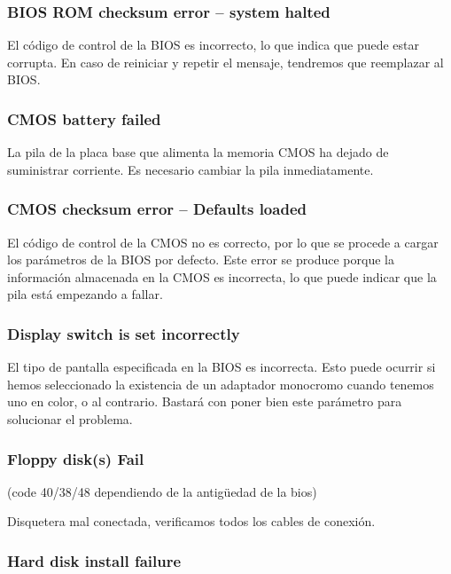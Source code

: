 \documentclass[12pt,oneside,a4paper]{article}
\begin{document}
		\subsubsection{BIOS ROM checksum error – system halted}

		El código de control de la BIOS es incorrecto, lo que indica que puede
		estar corrupta. En caso de reiniciar y repetir el mensaje, tendremos
		que reemplazar al BIOS.

		\subsubsection{CMOS battery failed}

		La pila de la placa base que alimenta la memoria CMOS ha dejado de
		suministrar corriente. Es necesario cambiar la pila inmediatamente.

		\subsubsection{CMOS checksum error – Defaults loaded}

		El código de control de la CMOS no es correcto, por lo que se
		procede a cargar los parámetros de la BIOS por defecto. Este error
		se produce porque la información almacenada en la CMOS es
		incorrecta, lo que puede indicar que la pila está empezando a
		fallar.

		\subsubsection{Display switch is set incorrectly}

		El tipo de pantalla especificada en la BIOS es incorrecta. Esto puede
		ocurrir si hemos seleccionado la existencia de un adaptador monocromo
		cuando tenemos uno en color, o al contrario. Bastará con poner bien
		este parámetro para solucionar el problema.

		\subsubsection{Floppy disk(s) Fail} 
		
		(code 40/38/48 dependiendo de la antigüedad de la bios)

		Disquetera mal conectada, verificamos todos los cables de conexión.

		\subsubsection{Hard disk install failure}
\end{document}
